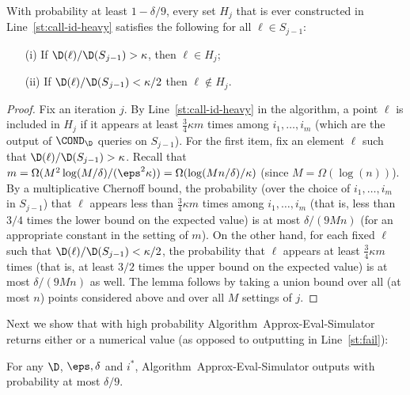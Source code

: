 \begin{lemma} \label{lem:Identify-Heavy}
With probability at least $1-\delta/9$, every set $H_{j}$ that is
ever constructed in Line~\ref{st:call-id-heavy} satisfies the following
for all $\ell \in S_{j-1}$:
\begin{itemize}
\item [(i)] If $\D(\ell)/\D(S{_{j-1}}) > \kappa$, then $\ell \in H{_j}$;
\item [(ii)] If $\D(\ell)/\D(S{_{j-1}}) < \kappa/2$
then $\ell \notin H{_j}.$
\end{itemize}
\end{lemma}

{
\begin{proof}
Fix an iteration $j$. By Line~\ref{st:call-id-heavy} in the algorithm,
a point $\ell$ is included in $H_j$ if it appears at least
${\frac 3 4} \kappa m$ times among $i_1,\dots,i_{m}$ (which are
the output of $\COND_\D$ queries on $S_{j-1}$).
For the first item, fix an element $\ell$ such that
$\D(\ell)/\D(S_{j-1}) > \kappa$.
Recall that
$m = \Omega(M^2 \log( M / \delta)/(\eps^2 \kappa)) =   \Omega(\log(M n/\delta)/\kappa)$ (since $M = \Omega(\log(n))$).
By a multiplicative Chernoff bound,
the probability (over the choice of $i_1,\dots,i_m$ in
$S_{j-1}$) that $\ell$ appears less than
${\frac 3 4} \kappa m$ times among $i_1,\dots,i_{m}$
(that is, less than $3/4$ times the lower bound on the expected value) is
at most $\delta/(9Mn)$ (for an appropriate constant in the
setting of $m$). On the other hand, for each fixed $\ell$ such that
$\D(\ell)/\D(S_{j-1}) < \kappa/2$, the probability that
$\ell$ appears at least ${\frac 3 4} \kappa m$ times
(that is, at least $3/2$ times the upper bound on the expected value)
is at most $\delta/(9Mn)$ as well.
The lemma follows by taking a union bound over all (at most $n$)
points considered above and over all $M$ settings of $j$.
\end{proof}
}


Next we show that with high probability Algorithm~{\sc Approx-Eval-Simulator}
returns either \unknown or a numerical value (as opposed to outputting
\fail in Line~\ref{st:fail}):

\begin{lemma} \label{lem:givesvalue}
For any $\D$, $\eps, \delta$ and $i^\ast$,
Algorithm~{\sc Approx-Eval-Simulator} outputs \fail with probability
at most $\delta/9.$
\end{lemma}

